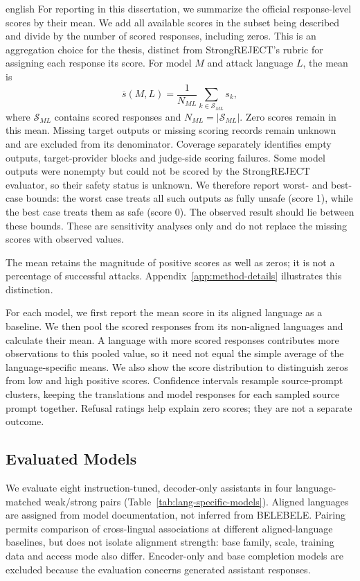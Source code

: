 \begin{otherlanguage*}{english}
For reporting in this dissertation, we summarize the official response-level scores by their mean. We add all available scores in the subset being described and divide by the number of scored responses, including zeros. This is an aggregation choice for the thesis, distinct from StrongREJECT's rubric for assigning each response its score. For model $M$ and attack language $L$, the mean is
\begin{equation}
\overline{s}(M,L)=\frac{1}{N_{ML}}\sum_{k\in\mathcal{S}_{ML}}s_k,
\label{eq:mean-strongreject}
\end{equation}
where $\mathcal{S}_{ML}$ contains scored responses and $N_{ML}=|\mathcal{S}_{ML}|$. Zero scores remain in this mean. Missing target outputs or missing scoring records remain unknown and are excluded from its denominator. Coverage separately identifies empty outputs, target-provider blocks and judge-side scoring failures. Some model outputs were nonempty but could not be scored by the StrongREJECT evaluator, so their safety status is unknown. We therefore report worst- and best-case bounds: the worst case treats all such outputs as fully unsafe (score 1), while the best case treats them as safe (score 0). The observed result should lie between these bounds. These are sensitivity analyses only and do not replace the missing scores with observed values.

The mean retains the magnitude of positive scores as well as zeros; it is not a percentage of successful attacks. Appendix~\ref{app:method-details} illustrates this distinction.

For each model, we first report the mean score in its aligned language as a baseline. We then pool the scored responses from its non-aligned languages and calculate their mean. A language with more scored responses contributes more observations to this pooled value, so it need not equal the simple average of the language-specific means. We also show the score distribution to distinguish zeros from low and high positive scores. Confidence intervals resample source-prompt clusters, keeping the translations and model responses for each sampled source prompt together. Refusal ratings help explain zero scores; they are not a separate outcome.

\subsection{Evaluated Models}
\label{sec:evaluated-models}

We evaluate eight instruction-tuned, decoder-only assistants in four language-matched weak/strong pairs (Table~\ref{tab:lang-specific-models}). Aligned languages are assigned from model documentation, not inferred from BELEBELE. Pairing permits comparison of cross-lingual associations at different aligned-language baselines, but does not isolate alignment strength: base family, scale, training data and access mode also differ. Encoder-only and base completion models are excluded because the evaluation concerns generated assistant responses.


\end{otherlanguage*}
